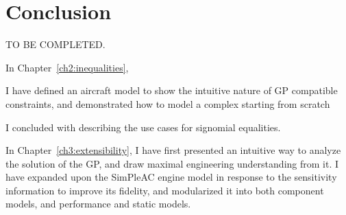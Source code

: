 \chapter{Conclusion}
\label{ch5:conclusion}

TO BE COMPLETED.

In Chapter~\ref{ch2:inequalities},

I have defined an aircraft model to show the intuitive nature of \gls{GP}
compatible constraints, and demonstrated how to model a complex
starting from scratch

I concluded with describing the use cases for signomial equalities.

In Chapter~\ref{ch3:extensibility}, I have first presented an intuitive
way to analyze the solution of the \gls{GP}, and draw maximal engineering
understanding from it. I have expanded upon the SimPleAC engine model
in response to the sensitivity information to improve its fidelity,
and modularized it into both component models, and performance and static models.


